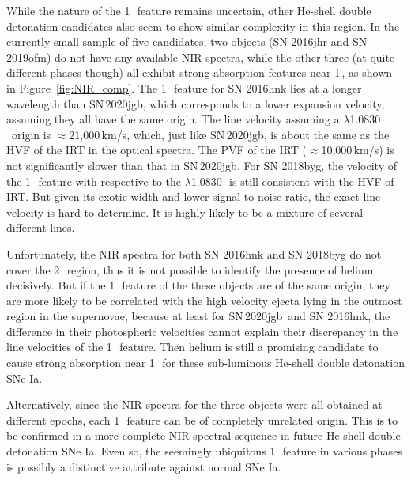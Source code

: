 \documentclass[twocolumn]{aastex631}
\newcommand\sn{SN\,2020jgb}
\begin{document}
While the nature of the 1\,\micron\ feature remains uncertain, other He-shell double detonation candidates also seem to show similar complexity in this region. In the currently small sample of five candidates, two objects (SN 2016jhr and SN 2019ofm) do not have any available NIR spectra, while the other three (at quite different phases though) all exhibit strong absorption features near 1\,\micron, as shown in Figure~\ref{fig:NIR_comp}. The 1\,\micron\ feature for SN 2016hnk lies at a longer wavelength than \sn, which corresponds to a lower expansion velocity, assuming they all have the same origin. The line velocity assuming a  $\lambda$1.0830\,\micron\ origin is $\approx$21,000\,km/s, which, just like \sn, is about the same as the HVF of the  IRT in the optical spectra. The PVF of the  IRT ($\approx$10,000\,km/s) is not significantly slower than that in \sn. For SN 2018byg, the velocity of the 1\,\micron\ feature with respective to the  $\lambda$1.0830\,\micron\ is still consistent with the HVF of  IRT. But given its exotic width and lower signal-to-noise ratio, the exact line velocity is hard to determine. It is highly likely to be a mixture of several different lines. 

Unfortunately, the NIR spectra for both SN 2016hnk and SN 2018byg do not cover the 2\,\micron\ region, thus it is not possible to identify the presence of helium decisively. But if the 1\,\micron\ feature of the these objects are of the same origin, they are more likely to be correlated with the high velocity ejecta lying in the outmost region in the supernovae, because at least for \sn\ and SN 2016hnk, the difference in their photospheric velocities cannot explain their discrepancy in the line velocities of the 1\,\micron\ feature. Then helium is still a promising candidate to cause strong absorption near 1\,\micron\ for these sub-luminous He-shell double detonation SNe Ia. 

Alternatively, since the NIR spectra for the three objects were all obtained at different epochs, each 1\,\micron\ feature can be of completely unrelated origin. This is to be confirmed in a more complete NIR spectral sequence in future He-shell double detonation SNe Ia. Even so, the seemingly ubiquitous 1\,\micron\ feature in various phases is possibly a distinctive attribute against normal SNe Ia.
\end{document}
